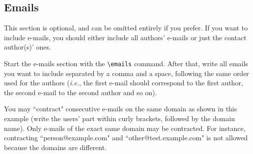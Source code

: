 \documentclass{article}
\begin{document}
\subsection{Emails}

This section is optional, and can be omitted entirely if you prefer. If you want to include e-mails, you should either include all authors' e-mails or just the contact author(s)' ones.

Start the e-mails section with the {\tt \textbackslash{}emails} command. After that, write all emails you want to include separated by a comma and a space, following the same order used for the authors (\emph{i.e.}, the first e-mail should correspond to the first author, the second e-mail to the second author and so on).

You may ``contract" consecutive e-mails on the same domain as shown in this example (write the users' part within curly brackets, followed by the domain name). Only e-mails of the exact same domain may be contracted. For instance, contracting ``person@example.com" and ``other@test.example.com" is not allowed because the domains are different.



\end{document}
